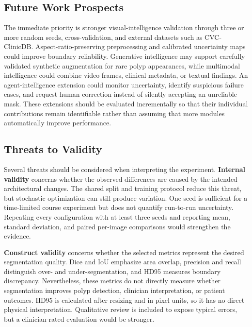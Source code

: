 \documentclass[a4paper,10pt]{article}
\begin{document}
\subsection{Future Work Prospects}

The immediate priority is stronger visual-intelligence validation through three or more random seeds, cross-validation, and external datasets such as CVC-ClinicDB. Aspect-ratio-preserving preprocessing and calibrated uncertainty maps could improve boundary reliability. Generative intelligence may support carefully validated synthetic augmentation for rare polyp appearances, while multimodal intelligence could combine video frames, clinical metadata, or textual findings. An agent-intelligence extension could monitor uncertainty, identify suspicious failure cases, and request human correction instead of silently accepting an unreliable mask. These extensions should be evaluated incrementally so that their individual contributions remain identifiable rather than assuming that more modules automatically improve performance.

\subsection{Threats to Validity}

Several threats should be considered when interpreting the experiment. \textbf{Internal validity} concerns whether the observed differences are caused by the intended architectural changes. The shared split and training protocol reduce this threat, but stochastic optimization can still produce variation. One seed is sufficient for a time-limited course experiment but does not quantify run-to-run uncertainty. Repeating every configuration with at least three seeds and reporting mean, standard deviation, and paired per-image comparisons would strengthen the evidence.

\textbf{Construct validity} concerns whether the selected metrics represent the desired segmentation quality. Dice and IoU emphasize area overlap, precision and recall distinguish over- and under-segmentation, and HD95 measures boundary discrepancy. Nevertheless, these metrics do not directly measure whether segmentation improves polyp detection, clinician interpretation, or patient outcomes. HD95 is calculated after resizing and in pixel units, so it has no direct physical interpretation. Qualitative review is included to expose typical errors, but a clinician-rated evaluation would be stronger.
\end{document}
